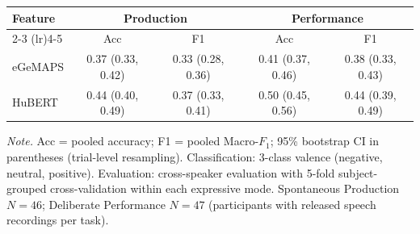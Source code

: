 \begin{tabular}{lcccc}
\toprule
Feature & \multicolumn{2}{c}{Production} & \multicolumn{2}{c}{Performance} \\
\cmidrule(lr){2-3} \cmidrule(lr){4-5}
 & Acc & F1 & Acc & F1 \\
\midrule
eGeMAPS & 0.37 (0.33, 0.42) & 0.33 (0.28, 0.36) & 0.41 (0.37, 0.46) & 0.38 (0.33, 0.43) \\
HuBERT & 0.44 (0.40, 0.49) & 0.37 (0.33, 0.41) & 0.50 (0.45, 0.56) & 0.44 (0.39, 0.49) \\
\bottomrule
\end{tabular}
\par\smallskip\noindent\scriptsize\textit{Note.} Acc = pooled accuracy; F1 = pooled Macro-$F_1$; 95\% bootstrap CI in parentheses (trial-level resampling). Classification: 3-class valence (negative, neutral, positive). Evaluation: cross-speaker evaluation with 5-fold subject-grouped cross-validation within each expressive mode. Spontaneous Production $N=46$; Deliberate Performance $N=47$ (participants with released speech recordings per task).